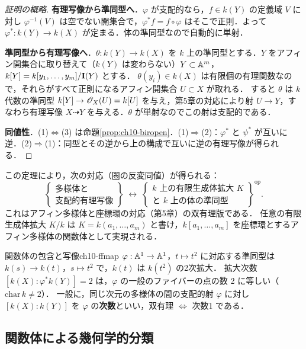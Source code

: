 \begin{proof}[証明の概略]
\textbf{有理写像から準同型へ}．$\varphi$ が支配的なら，$f\in k(Y)$ の定義域 $V$ に対し $\varphi^{-1}(V)$ は空でない開集合で，$\varphi^*f=f\circ\varphi$ はそこで正則．よって $\varphi^*:k(Y)\to k(X)$ が定まる．体の準同型なので自動的に単射．

\textbf{準同型から有理写像へ}．$\theta:k(Y)\to k(X)$ を $k$ 上の準同型とする．$Y$ をアフィン開集合に取り替えて（$k(Y)$ は変わらない）$Y\subset\mathbb{A}^m$，$k[Y]=k[y_1,\dots,y_m]/\mathbf{I}(Y)$ とする．
$\theta(y_i)\in k(X)$ は有限個の有理関数なので，それらがすべて正則になるアフィン開集合 $U\subset X$ が取れる．
すると $\theta$ は $k$ 代数の準同型 $k[Y]\to\mathscr{O}_X(U)=k[U]$ を与え，第5章の対応により射 $U\to Y$，すなわち有理写像 $X\dashrightarrow Y$ を与える．$\theta$ が単射なのでこの射は支配的である．

\textbf{同値性}．(1)$\Leftrightarrow$(3) は命題\ref{prop:ch10-biropen}．(1)$\Rightarrow$(2)：$\varphi^*$ と $\psi^*$ が互いに逆．(2)$\Rightarrow$(1)：同型とその逆から上の構成で互いに逆の有理写像が得られる．
\end{proof}

この定理により，次の対応（圏の反変同値）が得られる：
\[
  \left\{\begin{array}{c}\text{多様体と}\\\text{支配的有理写像}\end{array}\right\}
  \;\longleftrightarrow\;
  \left\{\begin{array}{c}k\text{ 上の有限生成体拡大 } K\\\text{と $k$ 上の体の準同型}\end{array}\right\}^{\mathrm{op}}.
\]
これはアフィン多様体と座標環の対応（第5章）の双有理版である．
任意の有限生成体拡大 $K/k$ は $K=k(a_1,\dots,a_m)$ と書け，$k[a_1,\dots,a_m]$ を座標環とするアフィン多様体の関数体として実現される．

\begin{myex}{関数体の包含と写像}{ch10-ffmap}
$\varphi:\mathbb{A}^1\to\mathbb{A}^1$，$t\mapsto t^2$ に対応する準同型は $k(s)\to k(t)$，$s\mapsto t^2$ で，$k(t)$ は $k(t^2)$ の2次拡大．
拡大次数 $[k(X):\varphi^*k(Y)]=2$ は，$\varphi$ の一般のファイバーの点の数 2 に等しい（$\mathrm{char}\,k\neq2$）．
一般に，同じ次元の多様体の間の支配的射 $\varphi$ に対し $[k(X):k(Y)]$ を $\varphi$ の\textbf{次数}といい，双有理 $\iff$ 次数1 である．
\end{myex}

\subsection{関数体による幾何学的分類}

